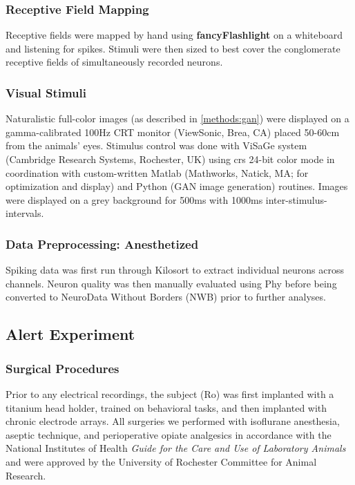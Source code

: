 \subsubsection*{Receptive Field Mapping}
Receptive fields were mapped by hand using \textbf{fancyFlashlight} on a whiteboard and listening for spikes. Stimuli were then sized to best cover the conglomerate receptive fields of simultaneously recorded neurons.

\subsubsection*{Visual Stimuli}
Naturalistic full-color images (as described in \ref{methods:gan}) were displayed on a gamma-calibrated 100Hz CRT monitor (ViewSonic, Brea, CA) placed 50-60cm from the animals' eyes. Stimulus control was done with ViSaGe system (Cambridge Research Systems, Rochester, UK) using crs 24-bit color mode in coordination with custom-written Matlab (Mathworks, Natick, MA; for optimization and display) and Python (GAN image generation) routines. Images were displayed on a grey background for 500ms with 1000ms inter-stimulus-intervals. 

\subsubsection*{Data Preprocessing: Anesthetized}
Spiking data was first run through Kilosort \parencite{Steinmetz2021} to extract individual neurons across channels. Neuron quality was then manually evaluated using Phy before being converted to NeuroData Without Borders (NWB) prior to further analyses.


\subsection{Alert Experiment}

\subsubsection*{Surgical Procedures}
Prior to any electrical recordings, the subject (Ro) was first implanted with a titanium head holder, trained on behavioral tasks, and then implanted with chronic electrode arrays. All surgeries we performed with isoflurane anesthesia, aseptic technique, and perioperative opiate analgesics in accordance with the National Institutes of Health \textit{Guide for the Care and Use of Laboratory Animals} \parencite{guide} and were approved by the University of Rochester Committee for Animal Research.

